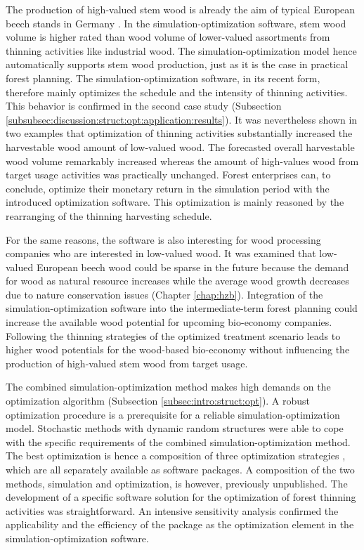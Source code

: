 The production of high-valued stem wood is already the aim of typical European beech stands in Germany \citep{nagel_2008}. In the simulation-optimization software, stem wood volume is higher rated than wood volume of lower-valued assortments from thinning activities like industrial wood. The simulation-optimization model hence automatically supports stem wood production, just as it is the case in practical forest planning. The simulation-optimization software, in its recent form, therefore mainly optimizes the schedule and the intensity of thinning activities. This behavior is confirmed in the second case study (Subsection \ref{subsubsec:discussion:struct:opt:application:results}). It was nevertheless shown in two examples that optimization of thinning activities substantially increased the harvestable wood amount of low-valued wood. The forecasted overall harvestable wood volume remarkably increased whereas the amount of high-values wood from target usage activities was practically unchanged. Forest enterprises can, to conclude, optimize their monetary return in the simulation period with the introduced optimization software. This optimization is mainly reasoned by the rearranging of the thinning harvesting schedule.

For the same reasons, the software is also interesting for wood processing companies who are interested in low-valued wood. It was examined that low-valued European beech wood could be sparse in the future because the demand for wood as natural resource increases while the average wood growth decreases due to nature conservation issues (Chapter \ref{chap:hzb}). Integration of the simulation-optimization software into the intermediate-term forest planning could increase the available wood potential for upcoming bio-economy companies. Following the thinning strategies of the optimized treatment scenario leads to higher wood potentials for the wood-based bio-economy without influencing the production of high-valued stem wood from target usage.

The combined si\-mu\-la\-tion-op\-ti\-mi\-za\-tion method makes high demands on the optimization algorithm (Subsection \ref{subsec:intro:struct:opt}). A robust optimization procedure is a prerequisite for a reliable si\-mu\-la\-tion-op\-ti\-mi\-za\-tion model. Stochastic methods with dynamic random structures were able to cope with the specific requirements of the combined si\-mu\-la\-tion-op\-ti\-mi\-za\-tion method. The best optimization is hence a composition of three optimization strategies \citep{corana_1987, kirkpatrick_1983, pronzato_1984}, which are all separately available as software packages. A composition of the two methods, simulation and optimization, is however, previously unpublished. The development of a specific software solution for the optimization of forest thinning activities was straightforward. An intensive sensitivity analysis confirmed the applicability and the efficiency of the package as the optimization element in the si\-mu\-la\-tion-op\-ti\-mi\-za\-tion software.

